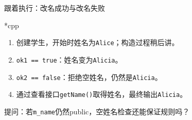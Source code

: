 \begin{frame}{跟着执行：改名成功与改名失败}
    \begin{Code}*{cpp}
        
    \end{Code}
    \begin{enumerate}
        \item 创建学生，开始时姓名为\texttt{Alice}；构造过程稍后讲。
        \item \texttt{ok1 == true}：姓名变为\texttt{Alicia}。
        \item \texttt{ok2 == false}：拒绝空姓名，仍然是\texttt{Alicia}。
        \item 通过查看接口\texttt{getName()}取得姓名，最终输出\texttt{Alicia}。
    \end{enumerate}
    \alert{提问：若\texttt{m\_name}仍然public，空姓名检查还能保证规则吗？}
\end{frame}

